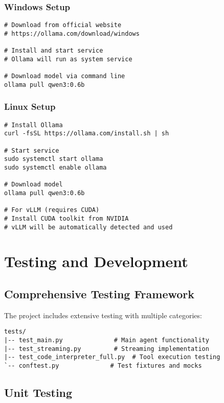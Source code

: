\documentclass{article}
\begin{document}
\subsubsection{Windows Setup}

\begin{lstlisting}[caption=Windows Installation]
# Download from official website
# https://ollama.com/download/windows

# Install and start service
# Ollama will run as system service

# Download model via command line
ollama pull qwen3:0.6b
\end{lstlisting}

\subsubsection{Linux Setup}

\begin{lstlisting}[caption=Linux Installation]
# Install Ollama
curl -fsSL https://ollama.com/install.sh | sh

# Start service
sudo systemctl start ollama
sudo systemctl enable ollama

# Download model
ollama pull qwen3:0.6b

# For vLLM (requires CUDA)
# Install CUDA toolkit from NVIDIA
# vLLM will be automatically detected and used
\end{lstlisting}

\section{Testing and Development}

\subsection{Comprehensive Testing Framework}

The project includes extensive testing with multiple categories:

\begin{lstlisting}[caption=Test Structure]
tests/
|-- test_main.py              # Main agent functionality
|-- test_streaming.py         # Streaming implementation
|-- test_code_interpreter_full.py  # Tool execution testing
`-- conftest.py              # Test fixtures and mocks
\end{lstlisting}

\subsection{Unit Testing}
\end{document}
